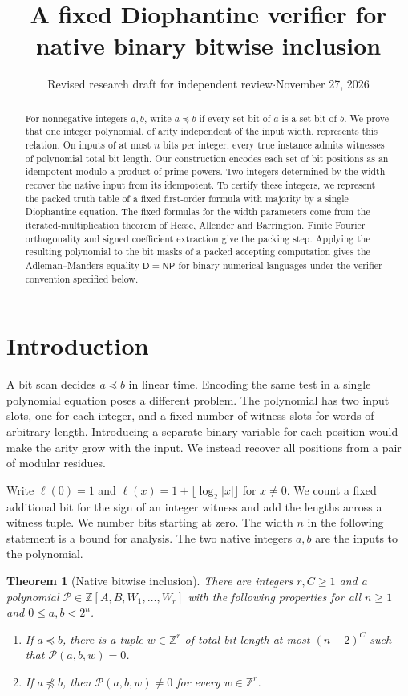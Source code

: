 \documentclass[11pt,letterpaper]{article}
\title{A fixed Diophantine verifier for\\native binary bitwise inclusion}
\author{}
\date{Revised research draft for independent review\enspace$\cdot$\enspace November 27, 2026}
\newtheorem{theorem}{Theorem}[section]
\numberwithin{equation}{section}
\newcommand{\ZZ}{\mathbb Z}
\newcommand{\DD}{\mathsf D}
\newcommand{\NP}{\mathsf{NP}}
\begin{document}
\maketitle
\begin{abstract}
For nonnegative integers $a,b$, write $a\preceq b$ if every set bit of $a$ is a set bit of $b$. We prove that one integer polynomial, of arity independent of the input width, represents this relation. On inputs of at most $n$ bits per integer, every true instance admits witnesses of polynomial total bit length. Our construction encodes each set of bit positions as an idempotent modulo a product of prime powers. Two integers determined by the width recover the native input from its idempotent. To certify these integers, we represent the packed truth table of a fixed first-order formula with majority by a single Diophantine equation. The fixed formulas for the width parameters come from the iterated-multiplication theorem of Hesse, Allender and Barrington. Finite Fourier orthogonality and signed coefficient extraction give the packing step. Applying the resulting polynomial to the bit masks of a packed accepting computation gives the Adleman--Manders equality $\DD=\NP$ for binary numerical languages under the verifier convention specified below.
\end{abstract}

\section{Introduction}\label{sec:intro}
A bit scan decides $a\preceq b$ in linear time. Encoding the same test in a single polynomial equation poses a different problem. The polynomial has two input slots, one for each integer, and a fixed number of witness slots for words of arbitrary length. Introducing a separate binary variable for each position would make the arity grow with the input. We instead recover all positions from a pair of modular residues.

Write $\ell(0)=1$ and $\ell(x)=1+\lfloor\log_2|x|\rfloor$ for $x\ne0$. We count a fixed additional bit for the sign of an integer witness and add the lengths across a witness tuple. We number bits starting at zero. The width $n$ in the following statement is a bound for analysis. The two native integers $a,b$ are the inputs to the polynomial.

\begin{theorem}[Native bitwise inclusion]\label{thm:main}
There are integers $r,C\ge1$ and a polynomial
$\mathcal P\in\ZZ[A,B,W_1,\ldots,W_r]$ with the following properties for all $n\ge1$ and $0\le a,b<2^n$.
\begin{enumerate}[label=\textup{(\roman*)}]
\item If $a\preceq b$, there is a tuple $w\in\ZZ^r$ of total bit length at most $(n+2)^C$ such that $\mathcal P(a,b,w)=0$.
\item If $a\not\preceq b$, then $\mathcal P(a,b,w)\ne0$ for every $w\in\ZZ^r$.
\end{enumerate}
\end{theorem}
\end{document}
